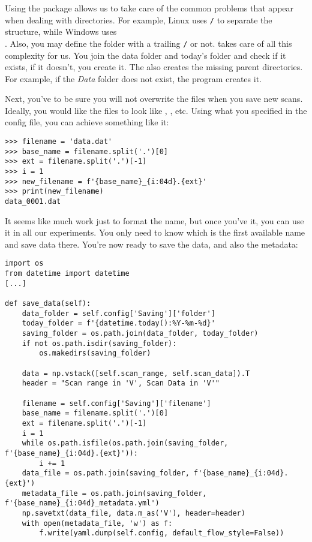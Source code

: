 Using the package  allows us to take care of the common problems that appear when dealing with directories. For example, Linux uses \texttt{/} to separate the structure, while Windows uses \texttt{\\}. Also, you may define the folder with a trailing \texttt{/} or not.  takes care of all this complexity for us. You join the data folder and today's folder and check if it exists, if it doesn't, you create it. The  also creates the missing parent directories. For example, if the \emph{Data} folder does not exist, the program creates it.

Next, you've to be sure you will not overwrite the files when you save new scans. Ideally, you would like the files to look like , , etc. Using what you specified in the config file, you can achieve something like it:

\begin{verbatim}
>>> filename = 'data.dat'
>>> base_name = filename.split('.')[0]
>>> ext = filename.split('.')[-1]
>>> i = 1
>>> new_filename = f'{base_name}_{i:04d}.{ext}'
>>> print(new_filename)
data_0001.dat
\end{verbatim}

It seems like much work just to format the name, but once you've it, you can use it in all our experiments. You only need to know which is the first available name and save data there. You're now ready to save the data, and also the metadata:

\begin{verbatim}
import os
from datetime import datetime
[...]

def save_data(self):
    data_folder = self.config['Saving']['folder']
    today_folder = f'{datetime.today():%Y-%m-%d}'
    saving_folder = os.path.join(data_folder, today_folder)
    if not os.path.isdir(saving_folder):
        os.makedirs(saving_folder)

    data = np.vstack([self.scan_range, self.scan_data]).T
    header = "Scan range in 'V', Scan Data in 'V'"

    filename = self.config['Saving']['filename']
    base_name = filename.split('.')[0]
    ext = filename.split('.')[-1]
    i = 1
    while os.path.isfile(os.path.join(saving_folder, f'{base_name}_{i:04d}.{ext}')):
        i += 1
    data_file = os.path.join(saving_folder, f'{base_name}_{i:04d}.{ext}')
    metadata_file = os.path.join(saving_folder, f'{base_name}_{i:04d}_metadata.yml')
    np.savetxt(data_file, data.m_as('V'), header=header)
    with open(metadata_file, 'w') as f:
        f.write(yaml.dump(self.config, default_flow_style=False))
\end{verbatim}


